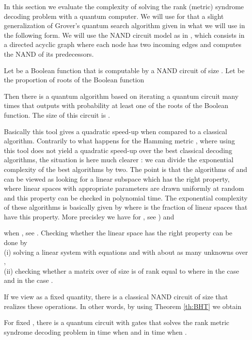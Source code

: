 \documentclass[11pt, a4paper]{llncs}
\begin{document}
In this section we evaluate the complexity of solving the rank (metric) syndrome decoding problem 
with a quantum computer. We will use for that a slight generalization of Grover's quantum search algorithm
\cite{G96,G97a} given in \cite{BHT98} what we will use in the following form. We will use the NAND circuit model
as in \cite{B10}, which consists in a directed acyclic graph where each node has two incoming edges and computes the NAND of its
predecessors.
\begin{theorem}\label{th:BHT}\cite{BHT98}
Let  be a Boolean function  that is computable by a NAND circuit of size . Let  be the proportion of roots of the Boolean function 

Then  there is a quantum algorithm based on iterating a quantum circuit   many times
that outputs with probability at least  one of the roots of the Boolean function.
The size of this circuit is .
\end{theorem}

Basically this tool gives a quadratic speed-up when compared to a classical algorithm.
Contrarily to what happens for the Hamming metric \cite{B10}, where using this tool does not yield
a quadratic speed-up over the best classical decoding algorithms, the situation is here much clearer :
we can divide the exponential complexity of the best algorithms by two. The point is  that the algorithms of \cite{GRS13}
and \cite{HT15} 
can be viewed as looking for a linear subspace which has the right property, where linear spaces with appropriate parameters are drawn uniformly at random and this property can be checked in polynomial time. 
The exponential complexity of these algorithms is basically given by  where 
 is the fraction of linear spaces that have this property.
More precisley we have 
 for , see \cite{HT15}) and  

when , see \cite{GRS13}.
Checking whether the linear space has the right property can be
done by \\
(i) solving a linear system with  equations and with about as many unknowns over , \\
(ii) checking whether  a matrix over  of size   is of rank equal to 
where  in the case  and 
 in the case .

  If we view  as a fixed quantity, there is a 
classical NAND circuit of size  that realizes these operations. In other words, by using Theorem
\ref{th:BHT} we obtain 
\begin{proposition}
For fixed , there is a quantum circuit with  gates that solves 
the rank metric syndrome decoding problem in time  when 
 and in time  when 
.
\end{proposition}
\end{document}
